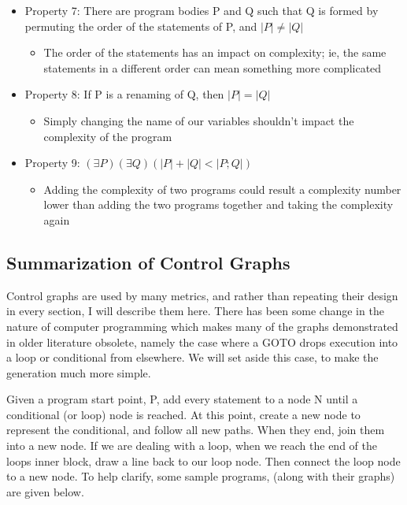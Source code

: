 \documentclass[]{article}
\begin{document}
\begin{itemize}
	\item Property 7: There are program bodies P and Q such that Q is formed by permuting the order of the statements of P, and $|P| \neq |Q|$
	\begin{itemize}
		\item The order of the statements has an impact on complexity; ie, the same statements in a different order can mean something more complicated
	\end{itemize}
	\item Property 8: If P is a renaming of Q, then $|P| = |Q|$
	\begin{itemize}
		\item Simply changing the name of our variables shouldn't impact the complexity of the program
	\end{itemize}
	\item Property 9: $(\exists P)(\exists Q)(|P|+|Q| < |P; Q|)$
	\begin{itemize}
		\item Adding the complexity of two programs could result a complexity number lower than adding the two programs together and taking the complexity again
	\end{itemize}
\end{itemize}

\subsection{Summarization of Control Graphs}

Control graphs are used by many metrics, and rather than repeating their design in every section, I will describe them here. 
There has been some change in the nature of computer programming which makes many of the graphs demonstrated in older literature obsolete, namely the case where a GOTO drops execution into a loop or conditional from elsewhere.
We will set aside this case, to make the generation much more simple.

Given a program start point, P, add every statement to a node N until a conditional (or loop) node is reached.
At this point, create a new node to represent the conditional, and follow all new paths.
When they end, join them into a new node.
If we are dealing with a loop, when we reach the end of the loops inner block, draw a line back to our loop node. 
Then connect the loop node to a new node. 
To help clarify, some sample programs, (along with their graphs) are given below.
\end{document}
